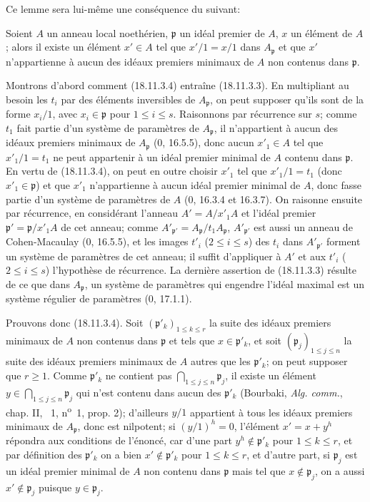 Ce lemme sera lui-même une conséquence du suivant:

\begin{lemma}[18.11.3.4]
\label{IV.18.11.3.4}
Soient $A$ un anneau local noethérien, $\mathfrak p$ un idéal premier de $A$, $x$ un élément de $A$; alors il existe un élément $x'\in A$ tel que $x'/1=x/1$ dans $A_{\mathfrak p}$ et que $x'$ n'appartienne à aucun des idéaux premiers minimaux de $A$ non contenus dans $\mathfrak p$.
\end{lemma}

Montrons d'abord comment (18.11.3.4) entraîne (18.11.3.3). En multipliant au besoin les $t_i$ par des éléments inversibles de $A_{\mathfrak p}$, on peut supposer qu'ils sont de la forme $x_i/1$, avec $x_i\in\mathfrak p$ pour $1\leq i\leq s$. Raisonnons par récurrence sur $s$; comme $t_1$ fait partie d'un système de paramètres de $A_{\mathfrak p}$, il n'appartient à aucun des idéaux premiers minimaux de $A_{\mathfrak p}$ (0, 16.5.5), donc aucun $x'_1\in A$ tel que $x'_1/1=t_1$ ne peut appartenir à un idéal premier minimal de $A$ contenu dans $\mathfrak p$. En vertu de (18.11.3.4), on peut en outre choisir $x'_1$ tel que $x'_1/1=t_1$ (donc $x'_1\in\mathfrak p$) et que $x'_1$ n'appartienne à aucun idéal premier minimal de $A$, donc fasse partie d'un système de paramètres de $A$ (0, 16.3.4 et 16.3.7). On raisonne ensuite par récurrence, en considérant l'anneau $A'=A/x'_1A$ et l'idéal premier $\mathfrak p'=\mathfrak p/x'_1A$ de cet anneau; comme $A'_{\mathfrak p'}=A_{\mathfrak p}/t_1A_{\mathfrak p}$, $A'_{\mathfrak p'}$ est aussi un anneau de Cohen-Macaulay (0, 16.5.5), et les images $t'_i$ ($2\leq i\leq s$) des $t_i$ dans $A'_{\mathfrak p'}$ forment un système de paramètres de cet anneau; il suffit d'appliquer à $A'$ et aux $t'_i$ ($2\leq i\leq s$) l'hypothèse de récurrence. La dernière assertion de (18.11.3.3) résulte de ce que dans $A_{\mathfrak p}$, un système de paramètres qui engendre l'idéal maximal est un système régulier de paramètres (0, 17.1.1).

Prouvons donc (18.11.3.4). Soit $(\mathfrak p'_k)_{1\leq k\leq r}$ la suite des idéaux premiers minimaux de $A$ non contenus dans $\mathfrak p$ et tels que $x\in\mathfrak p'_k$, et soit $(\mathfrak p_j)_{1\leq j\leq n}$ la suite des idéaux premiers minimaux de $A$ autres que les $\mathfrak p'_k$; on peut supposer que $r\geq1$. Comme $\mathfrak p'_k$ ne contient pas $\bigcap_{1\leq j\leq n}\mathfrak p_j$, il existe un élément $y\in\bigcap_{1\leq j\leq n}\mathfrak p_j$ qui n'est contenu dans aucun des $\mathfrak p'_k$ (Bourbaki, \emph{Alg. comm.}, chap. II, \textsection~1, n\textsuperscript{o}~1, prop. 2); d'ailleurs $y/1$ appartient à tous les idéaux premiers minimaux de $A_{\mathfrak p}$, donc est nilpotent; si $(y/1)^h=0$, l'élément $x'=x+y^h$ répondra aux conditions de l'énoncé, car d'une part $y^h\notin\mathfrak p'_k$ pour $1\leq k\leq r$, et par définition des $\mathfrak p'_k$ on a bien $x'\notin\mathfrak p'_k$ pour $1\leq k\leq r$, et d'autre part, si $\mathfrak p_j$ est un idéal premier minimal de $A$ non contenu dans $\mathfrak p$ mais tel que $x\notin\mathfrak p_j$, on a aussi $x'\notin\mathfrak p_j$ puisque $y\in\mathfrak p_j$.

